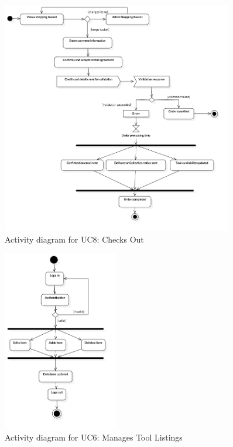 \begin{figure}[H]
      \centering
      \includegraphics[trim = 0 0 0 0, clip, width=0.9\textwidth]{TempImg/checkoutAD.png}
      \caption{Activity diagram for UC8: Checks Out}
 \end{figure}

\begin{figure}[H]
      \centering
      \includegraphics[trim = 0 0 0 0, clip, width=0.45\textwidth]{TempImg/manageToolsAD.png}
      \caption{Activity diagram for UC6: Manages Tool Listings}
 \end{figure}

